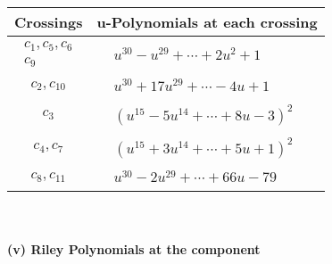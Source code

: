 \documentclass[1p]{elsarticle_modified}
\theoremstyle{definition}
\begin{document}
\begin{tabular}{m{50pt}|m{274pt}}
Crossings & \hspace{64pt}u-Polynomials at each crossing \\
\hline $$\begin{aligned}c_{1},c_{5},c_{6}\\c_{9}\end{aligned}$$&$\begin{aligned}
&u^{30}- u^{29}+\cdots+2 u^2+1
\end{aligned}$\\
\hline $$\begin{aligned}c_{2},c_{10}\end{aligned}$$&$\begin{aligned}
&u^{30}+17 u^{29}+\cdots-4 u+1
\end{aligned}$\\
\hline $$\begin{aligned}c_{3}\end{aligned}$$&$\begin{aligned}
&(u^{15}-5 u^{14}+\cdots+8 u-3)^{2}
\end{aligned}$\\
\hline $$\begin{aligned}c_{4},c_{7}\end{aligned}$$&$\begin{aligned}
&(u^{15}+3 u^{14}+\cdots+5 u+1)^{2}
\end{aligned}$\\
\hline $$\begin{aligned}c_{8},c_{11}\end{aligned}$$&$\begin{aligned}
&u^{30}-2 u^{29}+\cdots+66 u-79
\end{aligned}$\\
\hline
\end{tabular}\\~\\
\newpage\renewcommand{\arraystretch}{1}
\flushleft \textbf{(v) Riley Polynomials at the component}\newline \\
\end{document}
